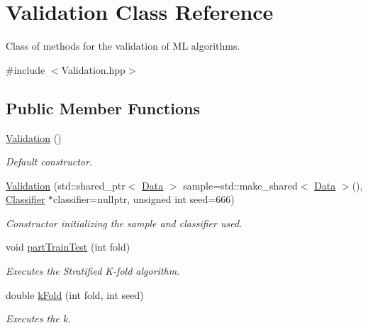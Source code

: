 \hypertarget{class_validation}{}\section{Validation Class Reference}
\label{class_validation}


Class of methods for the validation of ML algorithms.  




{\ttfamily \#include $<$Validation.\+hpp$>$}

\subsection*{Public Member Functions}
\begin{DoxyCompactItemize}
\item 
\mbox{\label{class_validation_ada040c6d31004cc277e2b74290eec266}} 
\hyperlink{class_validation_ada040c6d31004cc277e2b74290eec266}{Validation} ()
\begin{DoxyCompactList}\small\item\em Default constructor. \end{DoxyCompactList}\item 
\hyperlink{class_validation_abc3509e1641aa9fadf3bcdf3df368b2f}{Validation} (std\+::shared\+\_\+ptr$<$ \hyperlink{class_data}{Data} $>$ sample=std\+::make\+\_\+shared$<$ \hyperlink{class_data}{Data} $>$(), \hyperlink{class_classifier}{Classifier} $\ast$classifier=nullptr, unsigned int seed=666)
\begin{DoxyCompactList}\small\item\em Constructor initializing the sample and classifier used. \end{DoxyCompactList}\item 
void \hyperlink{class_validation_afc2e7f15bc873853b70e2cc3c47eecdc}{part\+Train\+Test} (int fold)
\begin{DoxyCompactList}\small\item\em Executes the Stratified K-\/fold algorithm. \end{DoxyCompactList}\item 
double \hyperlink{class_validation_a3aae72caef37b12a57aaf5cdd862de3a}{k\+Fold} (int fold, int seed)
\begin{DoxyCompactList}\small\item\em Executes the k. \end{DoxyCompactList}\item 

\end{DoxyCompactItemize}
